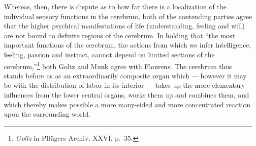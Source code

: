 \documentclass[12pt,a4paper]{book}
\newcommand{\opage}[1]{\marginnote{\footnotesize\textit{[#1]}}}
\begin{document}
Whereas, then, there is dispute as to how far there is a localization of
the individual sensory functions in the cerebrum, both of the contending
parties agree that the higher psychical manifestations of life
(understanding, feeling and will) are not bound to definite regions of
the cerebrum. In holding that ``the most important functions of the
cerebrum, the actions from which we infer intelligence, feeling, passion
and instinct, cannot depend on
\opage{51}limited sections of the cerebrum,''\footnote{\emph{Goltz} in
Pflügers Archiv. XXVI. p.~35.} both Goltz and Munk agree with Flourens.
The cerebrum thus stands before us as an extraordinarily composite organ
which --- however it may be with the distribution of labor in its
interior --- takes up the more elementary influences from the lower
central organs, works them up and combines them, and which thereby makes
possible a more many-sided and more concentrated reaction upon the
surrounding world.
\end{document}
